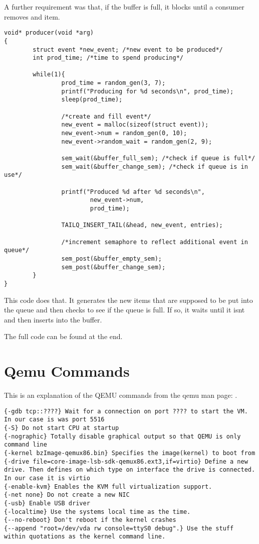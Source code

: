 \documentclass[10pt,onecolumn]{article}
\begin{document}
A further requirement was that, if the buffer is full, it blocks until a consumer removes and item.

\begin{lstlisting}
void* producer(void *arg)
{
        struct event *new_event; /*new event to be produced*/
        int prod_time; /*time to spend producing*/

        while(1){
                prod_time = random_gen(3, 7);
                printf("Producing for %d seconds\n", prod_time);
                sleep(prod_time);

                /*create and fill event*/
                new_event = malloc(sizeof(struct event));
                new_event->num = random_gen(0, 10);
                new_event->random_wait = random_gen(2, 9);

                sem_wait(&buffer_full_sem); /*check if queue is full*/
                sem_wait(&buffer_change_sem); /*check if queue is in use*/

                printf("Produced %d after %d seconds\n",
                        new_event->num,
                        prod_time);

                TAILQ_INSERT_TAIL(&head, new_event, entries);

                /*increment semaphore to reflect additional event in queue*/
                sem_post(&buffer_empty_sem);
                sem_post(&buffer_change_sem);
        }
}
\end{lstlisting}
This code does that. It generates the new items that are supposed to be put into the queue and then checks to see if the queue is full. If so, it waits until it isnt and then inserts into the buffer.


The full code can be found at the end.


\section{Qemu Commands}

This is an explanation of the QEMU commands from the qemu man page: \cite{qemu}.
\begin{verbatim}
{-gdb tcp::????} Wait for a connection on port ???? to start the VM. In our case is was port 5516
{-S} Do not start CPU at startup
{-nographic} Totally disable graphical output so that QEMU is only command line
{-kernel bzImage-qemux86.bin} Specifies the image(kernel) to boot from
{-drive file=core-image-lsb-sdk-qemux86.ext3,if=virtio} Define a new drive. Then defines on which type on interface the drive is connected. In our case it is virtio
{-enable-kvm} Enables the KVM full virtualization support.
{-net none} Do not create a new NIC
{-usb} Enable USB driver
{-localtime} Use the systems local time as the time.
{--no-reboot} Don't reboot if the kernel crashes
{--append "root=/dev/vda rw console=ttyS0 debug".} Use the stuff within quotations as the kernel command line.

\end{verbatim}
\end{document}
